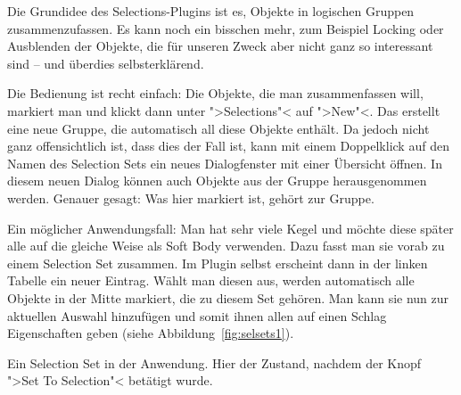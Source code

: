 \documentclass[10pt,DIV=14,a4paper]{scrartcl}
\begin{document}
Die Grundidee des Selections-Plugins ist es, Objekte in logischen
Gruppen zusammenzufassen. Es kann noch ein bisschen mehr, zum Beispiel
Locking oder Ausblenden der Objekte, die für unseren Zweck aber nicht
ganz so interessant sind -- und überdies selbst\-er\-klä\-rend.

Die Bedienung ist recht einfach: Die Objekte, die man zusammenfassen
will, markiert man und klickt dann unter ">Selections"< auf ">New"<. Das
erstellt eine neue Gruppe, die automatisch all diese Objekte enthält. Da
jedoch nicht ganz offensichtlich ist, dass dies der Fall ist, kann mit
einem Doppelklick auf den Namen des Selection Sets ein neues
Dialogfenster mit einer Übersicht öffnen. In diesem neuen Dialog können
auch Objekte aus der Gruppe herausgenommen werden. Genauer gesagt: Was
hier markiert ist, gehört zur Gruppe.

Ein möglicher Anwendungsfall: Man hat sehr viele Kegel und möchte diese
später alle auf die gleiche Weise als Soft Body verwenden. Dazu fasst
man sie vorab zu einem Selection Set zusammen. Im Plugin selbst
erscheint dann in der linken Tabelle ein neuer Eintrag. Wählt man diesen
aus, werden automatisch alle Objekte in der Mitte markiert, die zu
diesem Set gehören. Man kann sie nun zur aktuellen Auswahl hinzufügen
und somit ihnen allen auf einen Schlag Eigenschaften geben (siehe
Abbildung~\ref{fig:selsets1}).

{Ein Selection Set in der Anwendung. Hier der Zustand, nachdem der Knopf
">Set To Selection"< betätigt wurde.}

\end{document}
